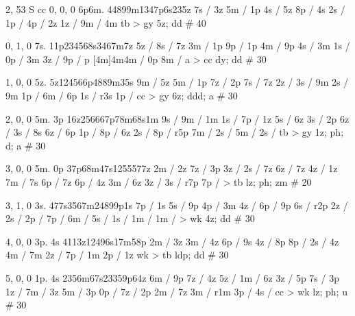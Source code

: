 % 
2, 53
S
cc
0, 0, 0
6p6m.
44899m1347p6s235z 
7s / 3z 
5m / 1p 
4s / 5z 
8p / 4s 
2s / 
1p / 
4p / 2z 
1z / 
9m / 4m 
tb > gy
5z; dd # 40

0, 1, 0
7s. 
11p234568s3467m7z
5z / 
8s / 7z 
3m / 1p 
9p / 1p 
4m / 9p 
4s / 3m 
1s / 
0p / 3m 
3z / 
9p / 
p [4m]4m4m / 0p
8m / a
> cc
dy; dd # 30 

1, 0, 0
5z.
5z124566p4889m35s
9m / 5z 
5m / 1p 
7z / 2p 
7s / 7z 
2z / 
3s / 9m 
2s / 9m 
1p / 
6m / 6p 
1s / r3s 
1p / 
cc > gy 
6z; ddd; a # 30

2, 0, 0
5m. 3p
16z256667p78m68s1m
9s / 
9m / 1m 
1s / 
7p / 1z 
5s / 6z 
3s / 2p 
6z / 
3s / 8s 
6z / 6p 
1p / 
8p / 6z 
2s / 
8p / r5p
7m / 
2s / 
5m / 
2s / 
tb > gy 
1z; ph; d; a # 30

3, 0, 0
5m. 0p
37p68m47s1255577z 
2m / 2z 
7z / 3p 
3z / 
2s / 7z 
6z / 7z 
4z / 1z 
7m / 7s 
6p / 7z 
6p / 4z 
3m / 6z 
3z / 
3s / r7p 
7p / 
> tb 
lz; ph; zm # 20

3, 1, 0
3s. 
477s3567m24899p1s
7p / 1s 
5s / 9p 
4p / 3m 
4z / 
6p / 9p 
6s / r2p 
2z / 
2s / 
2p / 
7p / 
6m / 
5s / 
1s /
1m /
1m / 
> wk
4z; dd # 30 

4, 0, 0
3p. 4s 
4113z12496s17m58p 
2m / 3z 
3m / 4z 
6p / 9s 
4z / 8p 
8p / 
2s / 4z 
4m / 7m 
2z / 
7p / 1m 
2p / 1z
wk > tb
ldp; dd # 30 

5, 0, 0
1p. 4s
2356m67s23359p64z 
6m / 9p 
7z / 4z 
5z / 
1m / 6z 
3z / 5p 
7s / 3p 
1z / 
7m / 3z 
5m / 3p 
0p / 
7z / 2p 
2m / 7z 
3m / r1m 
3p / 
4s / 
cc > wk 
lz; ph; u # 30